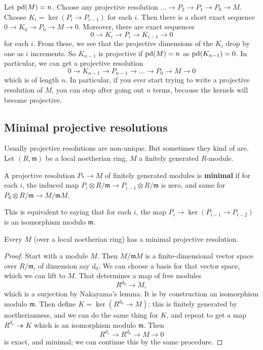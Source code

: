 Let $\mathrm{pd}(M) = n$. Choose any projective resolution $\dots \to
P_2 \to P_1 \to
P_0 \to M$. Choose $K_i = \ker(P_i \to P_{i-1})$ for each $i$. 
Then there is a short exact sequence $0 \to K_0 \to P_0 \to M
\to 0$. Moreover,
there are exact sequences
\[ 0 \to K_i \to P_i \to K_{i-1} \to 0  \]
for each $i$. From these, we see that the projective dimensions
of the $K_i$
drop by one as $i$ increments. So $K_{n-1}$ is projective if
$\mathrm{pd}(M) = n$ as
$\mathrm{pd}(K_{n-1})=0$. In particular, we can get a projective
resolution
\[ 0 \to K_{n-1} \to P_{n-1} \to \dots \to P_0 \to M \to 0  \]
which is of length $n$. 
In particular, if you ever start trying to write a projective
resolution of
$M$, you can stop after going out $n$ terms, because the kernels
will become
projective.


\subsection{Minimal projective resolutions}
Usually projective resolutions are non-unique. But sometimes
they kind of are.
Let $(R, \mathfrak{m})$ be a local noetherian ring, $M$ a
finitely generated $R$-module.

\begin{definition} 
A projective resolution $P_* \to M$ of finitely generated
modules is \textbf{minimal} if for each $i$, the
induced map $P_i \otimes R/\mathfrak{m} \to P_{i-1} \otimes
R/\mathfrak{m}$ is
zero, and same for $P_0 \otimes R/\mathfrak{m} \to
M/\mathfrak{m}M$.
\end{definition} 

This is equivalent to saying that for each $i$, the map $P_i
\to\ker(P_{i-1}
\to P_{i-2})$ is an isomorphism modulo $\mathfrak{m}$.

\begin{proposition} 
Every $M$ (over a local noetherian ring) has a minimal
projective resolution.
\end{proposition} 
\begin{proof} 
Start with a module $M$. Then $M/\mathfrak{m}M$ is a
finite-dimensional vector
space over $R/\mathfrak{m}$, of dimension say $d_0$. We can
choose a basis for that vector space, which
we can lift to $M$. That determines a map of free modules
\[ R^{d_0} \to M,  \]
which is a surjection by Nakayama's lemma. It is by construction
an
isomorphism modulo $\mathfrak{m}$. Then define $K =
\ker(R^{d_0}\to M)$; this
is finitely generated by noetherianness, and we
can do the same thing for $K$, and repeat to get a map $R^{d_1}
\twoheadrightarrow K$ which is an isomorphism modulo
$\mathfrak{m}$. Then
\[ R^{d_1} \to R^{d_0} \to M \to 0  \]
is exact, and minimal; we can continue this by the same
procedure.
\end{proof}


